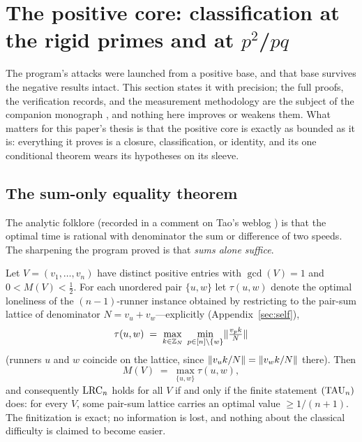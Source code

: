 
\section{The positive core: classification at the rigid primes and at
\boldmath$p^2$/$pq$}\label{sec:positive}

The program's attacks were launched from a positive base, and that base
survives the negative results intact. This section states it with
precision; the full proofs, the verification records, and the
measurement methodology are the subject of the companion monograph
\cite{prog-artifacts}, and nothing here improves or weakens them. What
matters for this paper's thesis is that the positive core is exactly as
bounded as it is: everything it proves is a closure, classification, or
identity, and its one conditional theorem wears its hypotheses on its
sleeve.

\subsection{The sum-only equality theorem}

The analytic folklore (recorded in a comment on Tao's weblog
\cite{Tao-blog}) is that the optimal time is rational with denominator
the sum or difference of two speeds. The sharpening the program proved
is that \emph{sums alone suffice}.

\begin{theorem}\label{thm:equality}
Let $V=(v_1,\dots,v_n)$ have distinct positive entries with
$\gcd(V)=1$ and $0<M(V)<\tfrac12$. For each unordered pair $\{u,w\}$
let $\tau(u,w)$ denote the optimal loneliness of the $(n-1)$-runner
instance obtained by restricting to the pair-sum lattice of denominator
$N=v_u+v_w$---explicitly (Appendix~\ref{sec:self}),
\[
\tau(u,w)\;=\;\max_{k\in\mathbb{Z}_{N}}\;\min_{p\in[n]\setminus\{w\}}
\lVert \tfrac{v_pk}{N} \rVert
\]
(runners $u$ and $w$ coincide on the lattice, since
$\lVert v_uk/N \rVert=\lVert v_wk/N \rVert$ there). Then
\[
M(V)\;=\;\max_{\{u,w\}}\tau(u,w),
\]
and consequently $\mathrm{LRC}_n$ holds for all $V$ if and only if the finite
statement $(\mathrm{TAU}_n)$ does: for every $V$, some pair-sum lattice
carries an optimal value $\ge 1/(n+1)$. The finitization is exact; no
information is lost, and nothing about the classical difficulty is
claimed to become easier.
\end{theorem}

